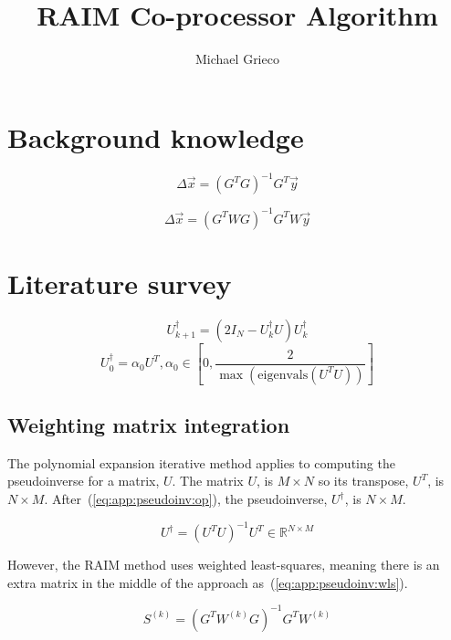 \documentclass[11pt]{article}
\title{RAIM Co-processor Algorithm}
\author{Michael Grieco}
\date{}
\begin{document}
\section{Background knowledge}

\begin{equation}
    \label{eq:bg:raim}
    \Delta \vec{x} = (G^T G)^{-1} G^T \vec{y}
\end{equation}

\begin{equation}
    \label{eq:bg:araim}
    \Delta \vec{x} = (G^T W G)^{-1} G^T W \vec{y}
\end{equation}

\section{Literature survey}

\begin{equation}
    \label{eq:app:pseudoinv:iteration}
    U^{\dagger}_{k+1}=(2I_N - U^{\dagger}_k U) U^{\dagger}_k
\end{equation}
\begin{equation}
    \label{eq:app:pseudoinv:initial}
    U^{\dagger}_0 = \alpha_0 U^T, \alpha_0 \in [0,\frac{2}{\max(\text{eigenvals}(U^T U))}]
\end{equation}

\subsection{Weighting matrix integration}

The polynomial expansion iterative method applies to computing the pseudoinverse for a matrix, $U$. The matrix $U$, is $M \times N$ so its transpose, $U^T$, is $N \times M$. After~(\ref{eq:app:pseudoinv:op}), the pseudoinverse, $U^{\dagger}$, is $N \times M$.

\begin{equation}
    \label{eq:app:pseudoinv:op}
    U^{\dagger} = (U^T U)^{-1} U^T \in \mathbb{R}^{N \times M}
\end{equation}

However, the RAIM method uses weighted least-squares, meaning there is an extra matrix in the middle of the approach as~(\ref{eq:app:pseudoinv:wls}).

\begin{equation}
    \label{eq:app:pseudoinv:wls}
    S^{(k)} = (G^T W^{(k)} G)^{-1} G^T W^{(k)}
\end{equation}
\end{document}
